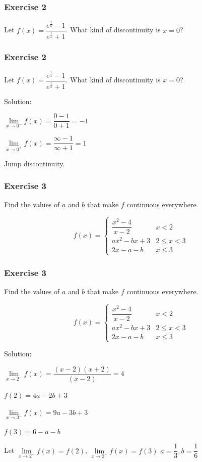 \documentclass{beamer}
\begin{document}
	\begin{frame}
		\frametitle{Exercise 2}
		Let $f(x) = \dfrac{e^{\frac{1}{x}} - 1}{e^{\frac{1}{x}} + 1}$. What kind of discontinuity is $x = 0$?
	\end{frame}
	
	\begin{frame}
		\frametitle{Exercise 2}
		Let $f(x) = \dfrac{e^{\frac{1}{x}} - 1}{e^{\frac{1}{x}} + 1}$. What kind of discontinuity is $x = 0$?
		
		Solution:
		
		$\lim\limits_{\textit{x} \to 0^-}f(x)=\dfrac{0-1}{0+1} = -1$
		
		$\lim\limits_{\textit{x} \to 0^+}f(x)=\dfrac{\infty - 1}{\infty + 1} = 1$
		
		Jump discontinuity.
	\end{frame}

	\begin{frame}
		\frametitle{Exercise 3}
		Find the values of $a$ and $b$ that make $f$ continuous everywhere.
		\begin{center}
			\begin{equation}
				f(x)=
				\begin{cases}
					\dfrac{x^{2} - 4}{x - 2} & x < 2\\
					ax^{2} - b{x} + 3 & 2 \leq x < 3\\
					2x - a - b & x \leq 3
				\end{cases}
			\end{equation}
		\end{center}
	\end{frame}
	
	\begin{frame}
		\frametitle{Exercise 3}
		Find the values of $a$ and $b$ that make $f$ continuous everywhere.
		\begin{center}
			\begin{equation}
				f(x)=
				\begin{cases}
					\dfrac{x^{2} - 4}{x - 2} & x < 2\\
					ax^{2} - b{x} + 3 & 2 \leq x < 3\\
					2x - a - b & x \leq 3
				\end{cases}
			\end{equation}
		\end{center}
		
		Solution:
		
		$\lim\limits_{\textit{x} \to 2^-}f(x)=\dfrac{(x-2)(x+2)}{(x-2)} = 4$
		
		$f(2)=4a-2b+3$
		
		$\lim\limits_{\textit{x} \to 3^-}f(x)=9a-3b+3$
		
		$f(3) = 6 - a -b$
		
		Let $\lim\limits_{\textit{x} \to 2^-}f(x)= f(2)$, $\lim\limits_{\textit{x} \to 3^-}f(x) = f(3)$ \rightarrow $a = \dfrac{1}{3}, b = \dfrac{1}{6}$
	\end{frame}
\end{document}

